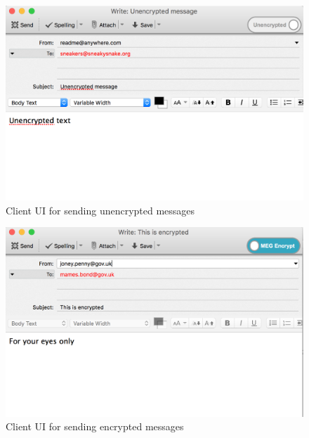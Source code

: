 \documentclass[10pt]{article}
\begin{document}
\begin{figure}[h]
    \centering
    \includegraphics[scale=.5]{unencrypted-client-ui.png}
    \caption{Client UI for sending unencrypted messages}
    \label{fig:unencrypted-ui}
\end{figure}
\begin{figure}[h]
    \centering
    \includegraphics[scale=.5]{encrypted-client-ui.png}
    \caption{Client UI for sending encrypted messages}
    \label{fig:encrypted-ui}
\end{figure}
\end{document}
